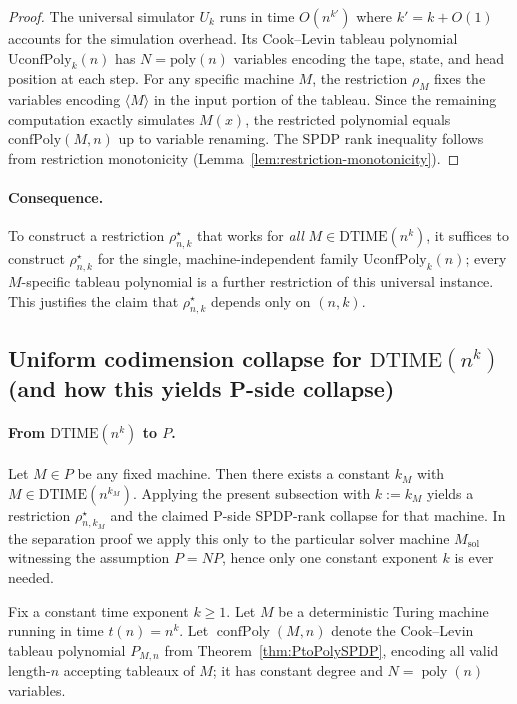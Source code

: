 \documentclass[12pt]{article}
\theoremstyle{definition}
\theoremstyle{definition}
\theoremstyle{remark}
\theoremstyle{remark}
\begin{document}
\begin{proof}
The universal simulator $U_k$ runs in time $O(n^{k'})$ where $k'=k+O(1)$ accounts for the
simulation overhead. Its Cook--Levin tableau polynomial $\mathrm{UconfPoly}_k(n)$ has
$N=\mathrm{poly}(n)$ variables encoding the tape, state, and head position at each step.
For any specific machine $M$, the restriction $\rho_M$ fixes the variables encoding
$\langle M\rangle$ in the input portion of the tableau. Since the remaining computation
exactly simulates $M(x)$, the restricted polynomial equals $\mathrm{confPoly}(M,n)$ up to
variable renaming. The SPDP rank inequality follows from restriction monotonicity
(Lemma~\ref{lem:restriction-monotonicity}).
\end{proof}

\paragraph{Consequence.}
To construct a restriction $\rho^\star_{n,k}$ that works for \emph{all} $M\in \mathrm{DTIME}(n^k)$,
it suffices to construct $\rho^\star_{n,k}$ for the single, machine-independent
family $\mathrm{UconfPoly}_k(n)$; every $M$-specific tableau polynomial is a further restriction
of this universal instance. This justifies the claim that $\rho^\star_{n,k}$ depends only on $(n,k)$.

\subsection{Uniform codimension collapse for $\mathrm{DTIME}(n^k)$ (and how this yields P-side collapse)}
\label{subsec:uniform-collapse-k}

\paragraph{From $\mathrm{DTIME}(n^k)$ to $P$.}
Let $M\in P$ be any fixed machine. Then there exists a constant $k_M$ with
$M\in \mathrm{DTIME}(n^{k_M})$. Applying the present subsection with $k:=k_M$ yields a restriction
$\rho^\star_{n,k_M}$ and the claimed P-side SPDP-rank collapse for that machine.
In the separation proof we apply this only to the particular solver machine $M_{\mathrm{sol}}$
witnessing the assumption $P=NP$, hence only one constant exponent $k$ is ever needed.

\medskip

Fix a constant time exponent $k\ge 1$. Let $M$ be a deterministic Turing machine running in time $t(n)=n^k$. Let $\operatorname{confPoly}(M,n)$ denote the Cook--Levin tableau polynomial $P_{M,n}$ from Theorem~\ref{thm:PtoPolySPDP}, encoding all valid length-$n$ accepting tableaux of $M$; it has constant degree and $N=\operatorname{poly}(n)$ variables.
\end{document}
